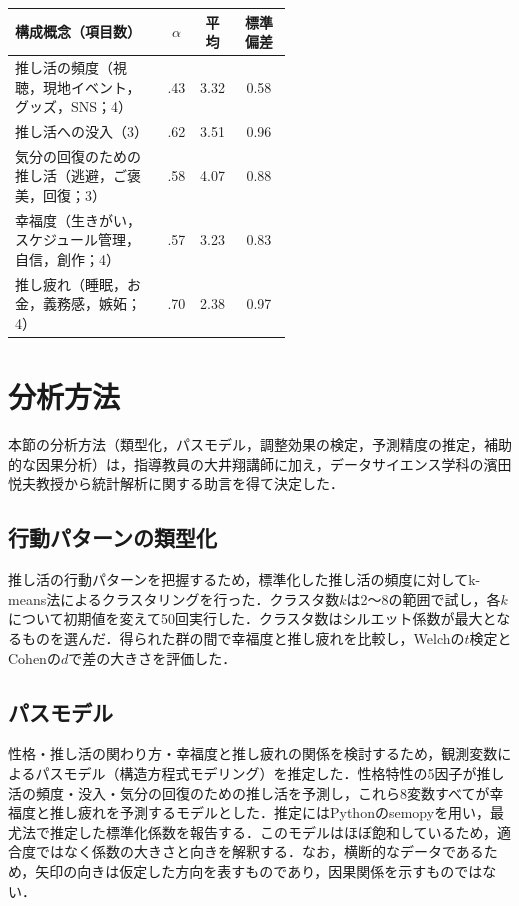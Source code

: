 \begin{table}[t]
\centering
{}
\label{tab:measures}
\small
\begin{tabular}{@{}p{0.55\linewidth}ccc@{}}
\toprule
構成概念（項目数） & $\alpha$ & 平均 & 標準偏差 \\
\midrule
推し活の頻度（視聴，現地イベント，グッズ，SNS；4） & .43 & 3.32 & 0.58 \\
推し活への没入（3） & .62 & 3.51 & 0.96 \\
気分の回復のための推し活（逃避，ご褒美，回復；3） & .58 & 4.07 & 0.88 \\
幸福度（生きがい，スケジュール管理，自信，創作；4） & .57 & 3.23 & 0.83 \\
推し疲れ（睡眠，お金，義務感，嫉妬；4） & .70 & 2.38 & 0.97 \\
\bottomrule
\end{tabular}
\end{table}

\section{分析方法}
本節の分析方法（類型化，パスモデル，調整効果の検定，予測精度の推定，補助的な因果分析）は，指導教員の大井翔講師に加え，データサイエンス学科の濱田悦夫教授から統計解析に関する助言を得て決定した．

\subsection{行動パターンの類型化}
推し活の行動パターンを把握するため，標準化した推し活の頻度に対してk-means法によるクラスタリングを行った．クラスタ数$k$は2〜8の範囲で試し，各$k$について初期値を変えて50回実行した．クラスタ数はシルエット係数\cite{rousseeuw1987}が最大となるものを選んだ．得られた群の間で幸福度と推し疲れを比較し，Welchの$t$検定とCohenの$d$で差の大きさを評価した．

\subsection{パスモデル}
性格・推し活の関わり方・幸福度と推し疲れの関係を検討するため，観測変数によるパスモデル（構造方程式モデリング\cite{toyoda1998}）を推定した．性格特性の5因子が推し活の頻度・没入・気分の回復のための推し活を予測し，これら8変数すべてが幸福度と推し疲れを予測するモデルとした．推定にはPythonのsemopy\cite{igolkina2020}を用い，最尤法で推定した標準化係数を報告する．このモデルはほぼ飽和しているため，適合度ではなく係数の大きさと向きを解釈する．なお，横断的なデータであるため，矢印の向きは仮定した方向を表すものであり，因果関係を示すものではない．

